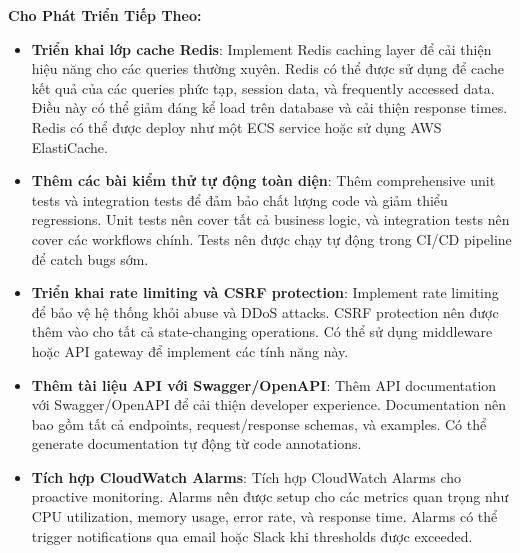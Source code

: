 \textbf{Cho Phát Triển Tiếp Theo:}
\begin{itemize}
    \item \textbf{Triển khai lớp cache Redis}: Implement Redis caching layer để cải thiện hiệu năng cho các queries thường xuyên. Redis có thể được sử dụng để cache kết quả của các queries phức tạp, session data, và frequently accessed data. Điều này có thể giảm đáng kể load trên database và cải thiện response times. Redis có thể được deploy như một ECS service hoặc sử dụng AWS ElastiCache.
    
    \item \textbf{Thêm các bài kiểm thử tự động toàn diện}: Thêm comprehensive unit tests và integration tests để đảm bảo chất lượng code và giảm thiểu regressions. Unit tests nên cover tất cả business logic, và integration tests nên cover các workflows chính. Tests nên được chạy tự động trong CI/CD pipeline để catch bugs sớm.
    
    \item \textbf{Triển khai rate limiting và CSRF protection}: Implement rate limiting để bảo vệ hệ thống khỏi abuse và DDoS attacks. CSRF protection nên được thêm vào cho tất cả state-changing operations. Có thể sử dụng middleware hoặc API gateway để implement các tính năng này.
    
    \item \textbf{Thêm tài liệu API với Swagger/OpenAPI}: Thêm API documentation với Swagger/OpenAPI để cải thiện developer experience. Documentation nên bao gồm tất cả endpoints, request/response schemas, và examples. Có thể generate documentation tự động từ code annotations.
    
    \item \textbf{Tích hợp CloudWatch Alarms}: Tích hợp CloudWatch Alarms cho proactive monitoring. Alarms nên được setup cho các metrics quan trọng như CPU utilization, memory usage, error rate, và response time. Alarms có thể trigger notifications qua email hoặc Slack khi thresholds được exceeded.
\end{itemize}

